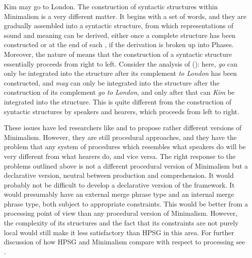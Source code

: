 \documentclass[output=paper,biblatex,babelshorthands,newtxmath,draftmode,colorlinks,citecolor=brown]{langscibook}
\begin{document}
\ea
Kim may go to London.
\z
The construction of syntactic structures within Minimalism is a very different matter. It begins with a set of words,
and they are gradually assembled into a syntactic structure, from which representations of sound and
meaning can be derived, either once a complete structure has been constructed or at the end of each
, if the derivation is broken up into Phases. Moreover, the nature of  means that the
construction of a syntactic structure essentially proceeds from right to left. Consider the
analysis of (): here, \emph{go} can only be integrated into the structure after its complement \emph{to London} has been
constructed, and \emph{may} can only be integrated into the structure after the construction of its
complement \emph{go to London}, and only after that can \emph{Kim} be integrated into the
structure. This is quite different from the construction of syntactic structures by speakers and
hearers, which proceeds from left to right.

These issues have led researchers like \citet{Phillips2003a} and \citet{Chesi2015a-u} to propose rather different
versions of Minimalism. However, they are still procedural approaches, and they have the problem
that any system of procedures which resembles what speakers do will be very different from what
hearers do, and vice versa. The right response to the problems outlined above is not a different
procedural version of Minimalism but a declarative version, neutral between production and
comprehension. It would probably not be difficult to develop a declarative version of the
framework. It would presumably have an external merge phrase type and an internal merge phrase type,
both subject to appropriate constraints. This would be better from a processing point of view than
any procedural version of Minimalism. However, the complexity of its structures and the fact that
its constraints are not purely local would still make it less satisfactory than HPSG in this area.
For further discussion of how HPSG and Minimalism compare with respect to processing see .


\end{document}
